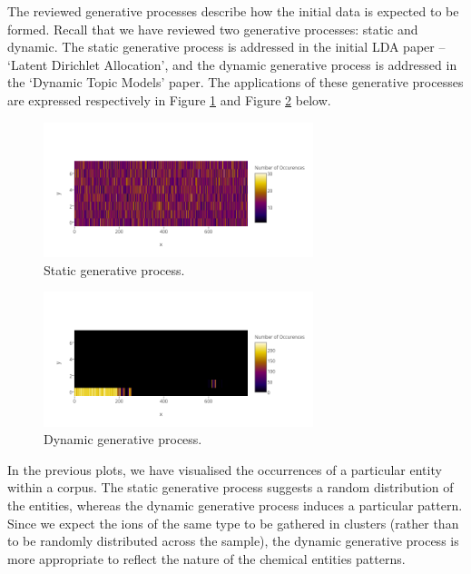 \documentclass{mprop}
\begin{document}
\par The reviewed generative processes describe how the initial data is expected to be formed. Recall that we have reviewed two generative processes: static and dynamic. The static generative process is addressed in the initial LDA paper -- `Latent Dirichlet Allocation', and the dynamic generative process is addressed in the `Dynamic Topic Models' paper. The applications of these generative processes are expressed respectively in Figure \ref{fig:static} and Figure \ref{fig:dynamic} below. 
\begin{figure}[H]
  \centering
  \includegraphics[width=0.7\textwidth]{static}
  \caption{Static generative process.}
  \label{fig:static}
\end{figure}
\begin{figure}[H]
  \centering
  \includegraphics[width=0.7\textwidth]{dynamic}
  \caption{Dynamic generative process.}
  \label{fig:dynamic}
\end{figure}
In the previous plots, we have visualised the occurrences of a particular entity within a corpus. The static generative process suggests a random distribution of the entities, whereas the dynamic generative process induces a particular pattern. Since we expect the ions of the same type to be gathered in clusters (rather than to be randomly distributed across the sample), the dynamic generative process is more appropriate to reflect the nature of the chemical entities patterns.  

\end{document}
